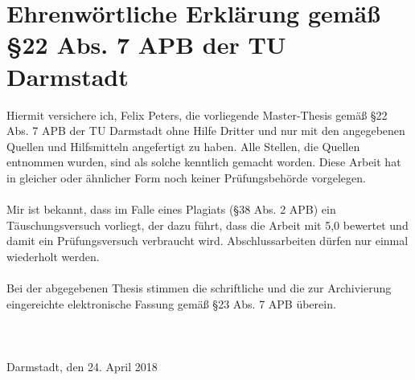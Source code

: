 %
%
%
%

\section*{Ehrenwörtliche Erklärung gemäß \S 22 Abs. 7 APB der TU Darmstadt}
Hiermit versichere ich, Felix Peters, die vorliegende Master-Thesis gemäß
\S 22 Abs. 7 APB der TU Darmstadt ohne Hilfe Dritter und nur mit den angegebenen
Quellen und Hilfsmitteln angefertigt zu haben. Alle Stellen, die Quellen
entnommen wurden, sind als solche kenntlich gemacht worden. Diese Arbeit hat in
gleicher oder ähnlicher Form noch keiner Prüfungsbehörde vorgelegen. \\
\\
Mir ist bekannt, dass im Falle eines Plagiats (\S 38 Abs. 2 APB) ein
Täuschungsversuch vorliegt, der dazu führt, dass die Arbeit mit 5,0 bewertet und
damit ein Prüfungsversuch verbraucht wird. Abschlussarbeiten dürfen nur einmal 
wiederholt werden. \\
\\
Bei der abgegebenen Thesis stimmen die schriftliche und die zur Archivierung
eingereichte elektronische Fassung gemäß \S 23 Abs. 7 APB überein. \\
\\
\\
\\
\noindent Darmstadt, den 24. April 2018
\\
\normalsize


